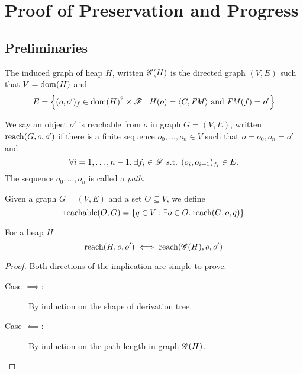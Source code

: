 \chapter{Proof of Preservation and Progress}
\label{cha:proof_of_pnp}

\section{Preliminaries}%
\label{sec:preliminaries}

\begin{definition}
  The induced graph of heap $H$, written $\mathscr{G}{(H)}$ is the directed graph
  $(V, E)$ such that $V = \mbox{$\mathrm{dom}$}{(H)}$ and 
  \begin{equation}
    E = \left\{ (o, o')_f \in \mbox{$\mathrm{dom}$}{(H)}^2 \times \mathscr{F} \mid
      H(o) = \mbox{$\langle C, \mathit{FM} \rangle$} \text{ and } \mathit{FM}(f) = o' \right\}
  \end{equation}
\end{definition}

\begin{definition}
  We say an object $o'$ is reachable from $o$ in graph $G = (V,
  E)$, written $\mbox{$\mathrm{reach}$}{(G, o, o')}$ if there is a finite sequence $o_0, \dots,
  o_n \in V$ such that $o = o_0, o_n = o'$ and
  \begin{equation}
    \forall i = 1,\dots, n-1. \: \exists f_i \in \mathscr{F} \text{ s.t. } (o_i,
    o_{i+1})_{f_i} \in E.
  \end{equation}
  The sequence $o_0, \dots, o_n$ is called a \emph{path}.
\end{definition}

\begin{definition}
  Given a graph $G = (V, E)$ and a set $O \subseteq V$, we define
  \begin{equation}
    \mbox{$\mathrm{reachable}$}{(O, G)} = \left\{ q \in V: \exists o\in O.\: \mbox{$\mathrm{reach}$}{(G, o, q)}
    \right\} \notag
  \end{equation}
\end{definition}

\begin{proposition}
  \label{prop:reacheq}
  For a heap $H$ 
  \begin{equation}
    \mbox{$\mathrm{reach}$}{(H, o, o')} \iff \mbox{$\mathrm{reach}$}{(\ensuremath{\mathscr{G}}{(H)}, o, o')}
  \end{equation}
\end{proposition}

\begin{proof}
  Both directions of the implication are simple to prove.
  \begin{description}
    \item[Case $\implies$:] By induction on the shape of derivation tree.
    \item[Case $\impliedby$:] By induction on the path length in graph
      $\mathscr{G}{(H)}$.
  \end{description}
\end{proof}

